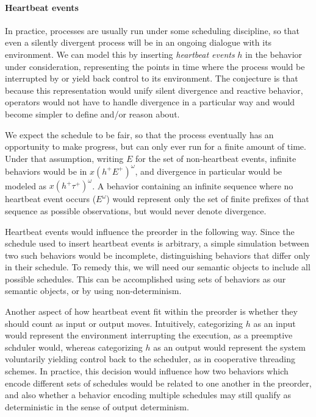 \documentclass[11pt]{article}
\begin{document}
\paragraph{Heartbeat events}

In practice,
processes are usually run under some scheduling discipline,
so that even a silently divergent process will be
in an ongoing dialogue with its environment.
We can model this by inserting \emph{heartbeat events} $h$
in the behavior under consideration,
representing the points in time where
the process would be interrupted by
or yield back control to its environment.
The conjecture is that because this representation would
unify silent divergence and reactive behavior,
operators would not have to handle divergence
in a particular way and
would become simpler to define and/or reason about.

We expect the schedule to be fair,
so that the process eventually has an opportunity
to make progress,
but can only ever run for a finite amount of time.
Under that assumption,
writing $E$ for the set of non-heartbeat events,
infinite behaviors would be in $x (h^+ E^+)^\omega$,
and divergence in particular would be modeled as $x (h^+ \tau^+)^\omega$.
A behavior containing
an infinite sequence where no heartbeat event occurs ($E^\omega$)
would represent only the set of finite prefixes
of that sequence as possible observations,
but would never denote divergence.

Heartbeat events would influence the preorder in the following way.
Since the schedule used to insert heartbeat events is arbitrary,
a simple simulation between two such behaviors would be incomplete,
distinguishing behaviors that differ only in their schedule.
To remedy this,
we will need our semantic objects to
include all possible schedules.
This can be accomplished using sets of behaviors
as our semantic objects,
or by using non-determinism.

Another aspect of how heartbeat event fit within the preorder
is whether they should count as input or output moves.
Intuitively, categorizing $h$ as an input
would represent the environment interrupting the execution,
as a preemptive schduler would,
whereas categorizing $h$ as an output
would represent the system voluntarily yielding control
back to the scheduler,
as in cooperative threading schemes.
In practice,
this decision would influence how two behaviors
which encode different sets of schedules
would be related to one another in the preorder,
and also whether a behavior encoding multiple schedules
may still qualify as deterministic
in the sense of output determinism.
\end{document}
